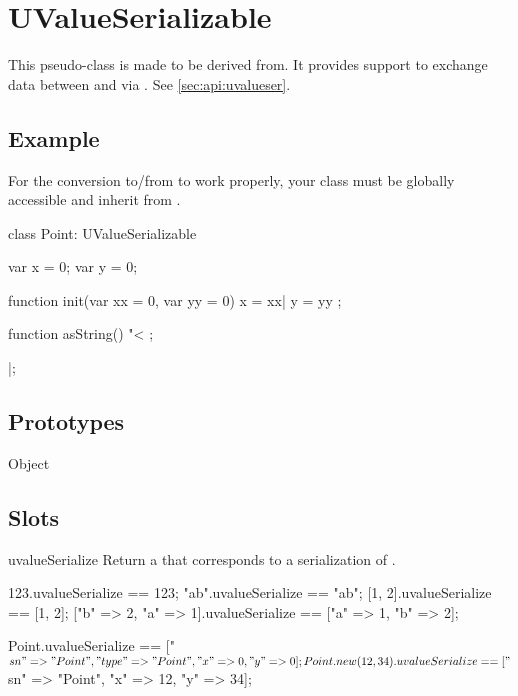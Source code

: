 
\section{UValueSerializable}

This pseudo-class is made to be derived from.  It provides support to
exchange data between \Cxx and \us via .  See
\autoref{sec:api:uvalueser}.

\subsection{Example}

For the conversion to/from \Cxx to work properly, your class must be
globally accessible and inherit from .

\begin{urbiscript}
class Point: UValueSerializable
{
  var x = 0;
  var y = 0;

  function init(var xx = 0, var yy = 0)
  {
    x = xx|
    y = yy
  };

  function asString()
  {
    "<%
  };
}|;
\end{urbiscript}

\subsection{Prototypes}

\begin{refObjects}
\item[Object]
\end{refObjects}

\subsection{Slots}

\begin{urbiscriptapi}
\item[uvalueSerialize]%
  Return a  that corresponds to a serialization of \this.
\begin{urbiassert}
                 123.uvalueSerialize == 123;
                "ab".uvalueSerialize == "ab";
              [1, 2].uvalueSerialize == [1, 2];
["b" => 2, "a" => 1].uvalueSerialize == ["a" => 1, "b" => 2];

Point.uvalueSerialize
   == ["$sn" => "Point", "type" => "Point", "x" => 0, "y" => 0];
Point.new(12, 34).uvalueSerialize
   == ["$sn" => "Point", "x" => 12, "y" => 34];
\end{urbiassert}

\end{urbiscriptapi}

